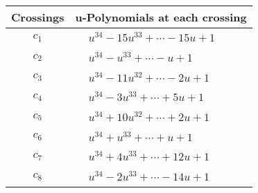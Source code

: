 \documentclass[1p]{elsarticle_modified}
\theoremstyle{definition}
\begin{document}
\begin{tabular}{m{50pt}|m{274pt}}
Crossings & \hspace{64pt}u-Polynomials at each crossing \\
\hline $$\begin{aligned}c_{1}\end{aligned}$$&$\begin{aligned}
&u^{34}-15 u^{33}+\cdots-15 u+1
\end{aligned}$\\
\hline $$\begin{aligned}c_{2}\end{aligned}$$&$\begin{aligned}
&u^{34}- u^{33}+\cdots- u+1
\end{aligned}$\\
\hline $$\begin{aligned}c_{3}\end{aligned}$$&$\begin{aligned}
&u^{34}-11 u^{32}+\cdots-2 u+1
\end{aligned}$\\
\hline $$\begin{aligned}c_{4}\end{aligned}$$&$\begin{aligned}
&u^{34}-3 u^{33}+\cdots+5 u+1
\end{aligned}$\\
\hline $$\begin{aligned}c_{5}\end{aligned}$$&$\begin{aligned}
&u^{34}+10 u^{32}+\cdots+2 u+1
\end{aligned}$\\
\hline $$\begin{aligned}c_{6}\end{aligned}$$&$\begin{aligned}
&u^{34}+u^{33}+\cdots+u+1
\end{aligned}$\\
\hline $$\begin{aligned}c_{7}\end{aligned}$$&$\begin{aligned}
&u^{34}+4 u^{33}+\cdots+12 u+1
\end{aligned}$\\
\hline $$\begin{aligned}c_{8}\end{aligned}$$&$\begin{aligned}
&u^{34}-2 u^{33}+\cdots-14 u+1
\end{aligned}$\\

\end{tabular}
\end{document}
